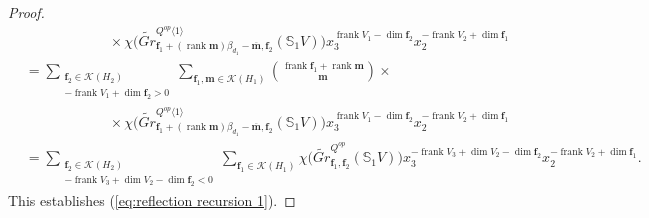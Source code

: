 \documentclass{amsart}
\numberwithin{equation}{section}
\theoremstyle{definition}
\def\SS{\mathbb{S}}
\def\bff{\mathbf{f}}
\def\bfm{\mathbf{m}}
\def\cK{\mathcal{K}}
\def\dim{\operatorname{dim}}
\def\frank{\operatorname{frank}}
\def\rank{\operatorname{rank}}
\newcommand{\rev}[1]{\overline{#1}}%
\renewcommand{\eqref}[1]{{\rm (\ref{#1})}}
\begin{document}
\begin{proof}
\begin{align*}
    &\hspace{1in}\times\chi\big(\widetilde{Gr}^{Q^{op}\langle 1\rangle}_{\bff_1+(\rank\bfm)\beta_{d_1}-\rev{\bfm},\bff_2}(\SS_1 V)\big) x_3^{\frank V_1-\dim\bff_2}x_2^{-\frank V_2+\dim\bff_1}\\
    &=\sum\limits_{\substack{\bff_2\in\cK(H_2)\\-\frank V_1+\dim\bff_2>0}}\sum\limits_{\bff_1,\bfm\in\cK(H_1)}{\frank\bff_1+\rank\bfm\choose\bfm}\times\\
    &\hspace{1in}\times\chi\big(\widetilde{Gr}^{Q^{op}\langle 1\rangle}_{\bff_1+(\rank\bfm)\beta_{d_1}-\rev{\bfm},\bff_2}(\SS_1 V)\big) x_3^{\frank V_1-\dim\bff_2}x_2^{-\frank V_2+\dim\bff_1}\\
    &=\sum\limits_{\substack{\bff_2\in\cK(H_2)\\-\frank V_3+\dim V_2-\dim\bff_2<0}}\sum\limits_{\bff_1\in\cK(H_1)}\chi\big(\widetilde{Gr}^{Q^{op}}_{\bff_1,\bff_2}(\SS_1 V)\big)x_3^{-\frank V_3+\dim V_2-\dim\bff_2}x_2^{-\frank V_2+\dim\bff_1}.
  \end{align*}
  This establishes \eqref{eq:reflection recursion 1}.
\end{proof}  
 
\end{document}
